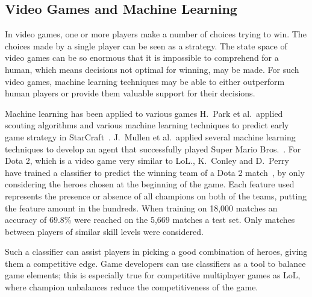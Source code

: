 \subsection{Video Games and Machine Learning}\label{sec:mlandonlinevideogames}
In video games, one or more players make a number of choices trying to win. The choices made by a single player can be seen as a strategy. The state space of video games can be so enormous that it is impossible to comprehend for a human, which means decisions not optimal for winning, may be made. For such video games, machine learning techniques may be able to either outperform human players or provide them valuable support for their decisions.

Machine learning has been applied to various games H.\ Park et al.\ applied scouting algorithms and various machine learning techniques to predict early game strategy in StarCraft~\cite{Park:2012:PES:2425296.2425298}. J.\ Mullen et al.\ applied several machine learning techniques to develop an agent that successfully played Super Mario Bros.~\cite{supermario}. For Dota 2, which is a video game very similar to LoL.\@, K.\ Conley and D.\ Perry have trained a classifier to predict the winning team of a Dota 2 match~\cite{dota2article}, by only considering the heroes chosen at the beginning of the game. Each feature used represents the presence or absence of all champions on both of the teams, putting the feature amount in the hundreds. When training on 18,000 matches an accuracy of 69.8\% were reached on the 5,669 matches a test set. Only matches between players of similar skill levels were considered. 

Such a classifier can assist players in picking a good combination of heroes, giving them a competitive edge. Game developers can use classifiers as a tool to balance game elements; this is especially true for competitive multiplayer games as LoL, where champion unbalances reduce the competitiveness of the game.

%
%




